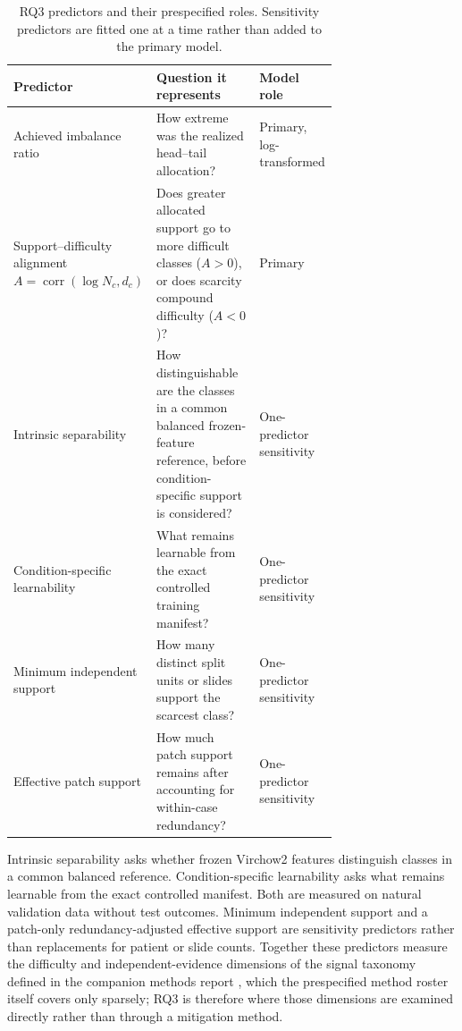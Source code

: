 \documentclass[11pt]{article}
\begin{document}
\begin{table}[ht]
  \centering
  \footnotesize
  \begin{tabularx}{\linewidth}{@{}>{\raggedright\arraybackslash}p{0.23\linewidth}>{\raggedright\arraybackslash}p{0.49\linewidth}X@{}}
    \toprule
    Predictor & Question it represents & Model role \\
    \midrule
    Achieved imbalance ratio & How extreme was the realized head--tail allocation? & Primary, log-transformed \\
    Support--difficulty alignment $A=\operatorname{corr}(\log N_c,d_c)$ & Does greater allocated support go to more difficult classes ($A>0$), or does scarcity compound difficulty ($A<0$)? & Primary \\
    Intrinsic separability & How distinguishable are the classes in a common balanced frozen-feature reference, before condition-specific support is considered? & One-predictor sensitivity \\
    Condition-specific learnability & What remains learnable from the exact controlled training manifest? & One-predictor sensitivity \\
    Minimum independent support & How many distinct split units or slides support the scarcest class? & One-predictor sensitivity \\
    Effective patch support & How much patch support remains after accounting for within-case redundancy? & One-predictor sensitivity \\
    \bottomrule
  \end{tabularx}
  \caption{RQ3 predictors and their prespecified roles. Sensitivity predictors are fitted one at a time rather than added to the primary model.}
  \label{tab:rq3-predictors}
\end{table}

Intrinsic separability asks whether frozen Virchow2 features distinguish classes in a common balanced reference. Condition-specific learnability asks what remains learnable from the exact controlled manifest. Both are measured on natural validation data without test outcomes. Minimum independent support and a patch-only redundancy-adjusted effective support are sensitivity predictors rather than replacements for patient or slide counts. Together these predictors measure the difficulty and independent-evidence dimensions of the signal taxonomy defined in the companion methods report \citep{queisler2026imbalanceMethods}, which the prespecified method roster itself covers only sparsely; RQ3 is therefore where those dimensions are examined directly rather than through a mitigation method.
\end{document}
